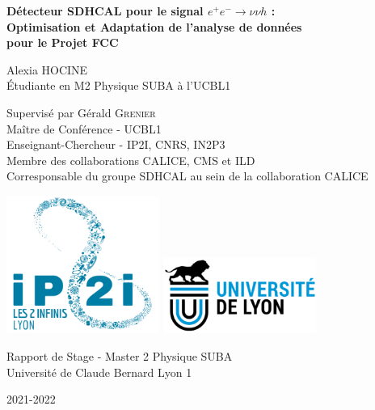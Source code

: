 
\begin{titlepage}
	\begin{center}
		
    		\vspace*{3cm}

    		\LARGE
    		\textbf{Détecteur SDHCAL pour le signal  $ e^{+} e^{-} \longrightarrow \nu \nu h $ :\\Optimisation et Adaptation de l'analyse de données\\pour le Projet FCC}

    		\vspace{1.5cm}

    		Alexia \textsc{HOCINE}\\
    		\vspace{0.4cm}
    		\large 
    			Étudiante en M2 Physique SUBA à l'UCBL1
    		
		\vspace{1.5cm}
		\Large
		Supervisé par Gérald \textsc{Grenier}\\
    		\vspace{0.4cm}
    		\large 
    			Maître de Conférence - UCBL1\\
    			Enseignant-Chercheur - IP2I, CNRS, IN2P3\\
    			Membre des collaborations CALICE, CMS et ILD\\
    			Corresponsable du groupe SDHCAL au sein de la collaboration CALICE

    		\vfill

		\includegraphics[width=5cm]{../img/Logo_IP2I.png}
 		\includegraphics[width=5cm]{../img/UdL-logo.png}

		\vspace{3cm} 

    		Rapport de Stage - Master 2 Physique SUBA\\
    		Université de Claude Bernard Lyon 1 \\    		

    		\vspace{1.5cm}
    		
    		2021-2022
    
 		
	\end{center}

\end{titlepage}